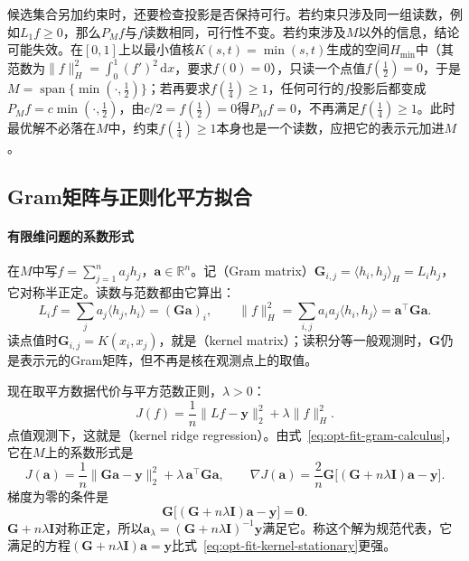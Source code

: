 候选集合另加约束时，还要检查投影是否保持可行。若约束只涉及同一组读数，例如$L_1f\ge0$，那么$P_Mf$与$f$读数相同，可行性不变。若约束涉及$M$以外的信息，结论可能失效。在$[0,1]$上以最小值核$K(s,t)=\min(s,t)$生成的空间$H_{\min}$中（其范数为$\|f\|_H^2=\int_0^1(f')^2\,\mathrm dx$，要求$f(0)=0$），只读一个点值$f(\tfrac12)=0$，于是$M=\operatorname{span}\{\min(\cdot,\tfrac12)\}$；若再要求$f(\tfrac14)\ge1$，任何可行的$f$投影后都变成$P_Mf=c\min(\cdot,\tfrac12)$，由$c/2=f(\tfrac12)=0$得$P_Mf=0$，不再满足$f(\tfrac14)\ge1$。此时最优解不必落在$M$中，约束$f(\tfrac14)\ge1$本身也是一个读数，应把它的表示元加进$M$。

\subsection{Gram矩阵与正则化平方拟合}
\label{sec:opt-fit-gram}

\paragraph{有限维问题的系数形式}
在$M$中写$f=\sum_{j=1}^na_jh_j$，$\bm a\in\mathbb R^n$。记（Gram matrix）$\bm G_{i,j}=\langle h_i,h_j\rangle_H=L_ih_j$，它对称半正定。读数与范数都由它算出：
\begin{equation}
  L_if=\sum_ja_j\langle h_j,h_i\rangle=(\bm G\bm a)_i,\qquad
  \|f\|_H^2=\sum_{i,j}a_ia_j\langle h_i,h_j\rangle=\bm a^\top\bm G\bm a .
  \label{eq:opt-fit-gram-calculus}
\end{equation}
读点值时$\bm G_{i,j}=K(x_i,x_j)$，就是（kernel matrix）；读积分等一般观测时，$\bm G$仍是表示元的Gram矩阵，但不再是核在观测点上的取值。

现在取平方数据代价与平方范数正则，$\lambda>0$：
\begin{equation}
  J(f)=\frac1n\|Lf-\bm y\|_2^2+\lambda\|f\|_H^2 .
  \label{eq:opt-fit-kernel-ridge}
\end{equation}
点值观测下，这就是（kernel ridge regression）。由式~\eqref{eq:opt-fit-gram-calculus}，它在$M$上的系数形式是
\[
  J(\bm a)=\frac1n\|\bm G\bm a-\bm y\|_2^2+\lambda\,\bm a^\top\bm G\bm a ,\qquad
  \nabla J(\bm a)=\frac2n\bm G\bigl[(\bm G+n\lambda\bm I)\bm a-\bm y\bigr].
\]
梯度为零的条件是
\begin{equation}
  \bm G\bigl[(\bm G+n\lambda\bm I)\bm a-\bm y\bigr]=\bm 0 .
  \label{eq:opt-fit-kernel-stationary}
\end{equation}
$\bm G+n\lambda\bm I$对称正定，所以$\bm a_\lambda=(\bm G+n\lambda\bm I)^{-1}\bm y$满足它。称这个解为规范代表，它满足的方程$(\bm G+n\lambda\bm I)\bm a=\bm y$比式~\eqref{eq:opt-fit-kernel-stationary}更强。

